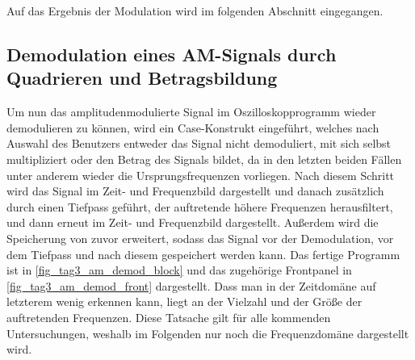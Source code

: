 \documentclass[
a4paper,
12pt,
pagesize,
ngerman
]{scrartcl}
\begin{document}
	Auf das Ergebnis der Modulation wird im folgenden Abschnitt eingegangen.
	
	
	\subsection{Demodulation eines AM-Signals durch Quadrieren und Betragsbildung} \label{DemodulationAM}
	Um nun das amplitudenmodulierte Signal im Oszilloskopprogramm wieder demodulieren zu können, wird ein Case-Konstrukt eingeführt, welches nach Auswahl des Benutzers entweder das Signal nicht demoduliert, mit sich selbst multipliziert oder den Betrag des Signals bildet, da in den letzten beiden Fällen unter anderem wieder die Ursprungsfrequenzen vorliegen.
	Nach diesem Schritt wird das Signal im Zeit- und Frequenzbild dargestellt und danach zusätzlich durch einen Tiefpass geführt, der auftretende höhere Frequenzen herausfiltert, und dann erneut im Zeit- und Frequenzbild dargestellt.
	Außerdem wird die Speicherung von zuvor erweitert, sodass das Signal vor der Demodulation, vor dem Tiefpass und nach diesem gespeichert werden kann.
	Das fertige Programm ist in \cref{fig_tag3_am_demod_block} und das zugehörige Frontpanel in \cref{fig_tag3_am_demod_front} dargestellt.
	Dass man in der Zeitdomäne auf letzterem wenig erkennen kann, liegt an der Vielzahl und der Größe der auftretenden Frequenzen.
	Diese Tatsache gilt für alle kommenden Untersuchungen, weshalb im Folgenden nur noch die Frequenzdomäne dargestellt wird.
	
\end{document}
